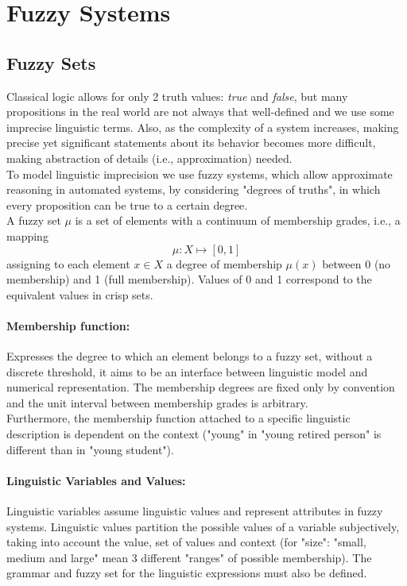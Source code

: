 \section{Fuzzy Systems}

\subsection{Fuzzy Sets}

Classical logic allows for only 2 truth values: \textit{true} and \textit{false}, but  many propositions in the real world are not always that well-defined and we use some imprecise linguistic terms. Also, as the complexity of a system increases, making precise yet significant statements about its behavior becomes more difficult, making abstraction of details (i.e., approximation) needed.\\

To model linguistic imprecision we use fuzzy systems, which allow approximate reasoning in automated systems, by considering "degrees of truths", in which every proposition can be true to a certain degree.\\

A fuzzy set $\mu$ is a set of elements with a continuum of membership grades, i.e., a mapping
$$ \mu: X \mapsto [0,1] $$
assigning to each element $x \in X$ a degree of membership $\mu(x)$ between 0 (no membership) and 1 (full membership). Values of 0 and 1 correspond to the equivalent values in crisp sets.\\

\paragraph{Membership function:} Expresses the degree to which an element belongs to a fuzzy set, without a discrete threshold, it aims to be an interface between linguistic model and numerical representation. The membership degrees are fixed only by convention and the unit interval between membership grades is arbitrary.\\
Furthermore, the membership function attached to a specific linguistic description is dependent on the context ("young" in "young retired person" is different than in "young student").\\

\paragraph{Linguistic Variables and Values:} Linguistic variables assume linguistic values and represent attributes in fuzzy systems. Linguistic values partition the possible values of  a variable subjectively, taking into account the value, set of values and context (for "size": "small, medium and large" mean 3 different "ranges" of possible membership). The grammar and fuzzy set for the linguistic expressions must also be defined.\\

